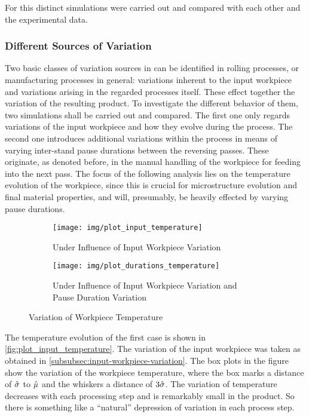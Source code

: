 For this distinct simulations were carried out and compared with each other and the experimental data.

\subsubsection{Different Sources of Variation}\label{subsubsec:different-sources-of-variation}

Two basic classes of variation sources in can be identified in rolling processes, or manufacturing processes in general: variations inherent to the input workpiece and variations arising in the regarded processes itself.
These effect together the variation of the resulting product.
To investigate the different behavior of them, two simulations shall be carried out and compared.
The first one only regards variations of the input workpiece and how they evolve during the process.
The second one introduces additional variations within the process in means of varying inter-stand pause durations between the reversing passes.
These originate, as denoted before, in the manual handling of the workpiece for feeding into the next pass.
The focus of the following analysis lies on the temperature evolution of the workpiece, since this is crucial for microstructure evolution and final material properties, and will, presumably, be heavily effected by varying pause durations.

\begin{figure}
    \begin{subfigure}{\linewidth}
        \centering
        \texttt{[image: img/plot\_input\_temperature]}
        \caption{Under Influence of Input Workpiece Variation}
        \label{fig:plot_input_temperature}
    \end{subfigure}
    \begin{subfigure}{\linewidth}
        \centering
        \texttt{[image: img/plot\_durations\_temperature]}
        \caption{Under Influence of Input Workpiece Variation and Pause Duration Variation}
        \label{fig:plot_durations_temperature}
    \end{subfigure}
    \caption{Variation of Workpiece Temperature}
\end{figure}


The temperature evolution of the first case is shown in \autoref{fig:plot_input_temperature}.
The variation of the input workpiece was taken as obtained in \autoref{subsubsec:input-workpiece-variation}.
The box plots in the figure show the variation of the workpiece temperature, where the box marks a distance of ${\hat{{\sigma}}}$ to ${\hat{{\mu}}}$ and the whiskers a distance of $3{\hat{{\sigma}}}$.
The variation of temperature decreases with each processing step and is remarkably small in the product.
So there is something like a ``natural'' depression of variation in each process step.

